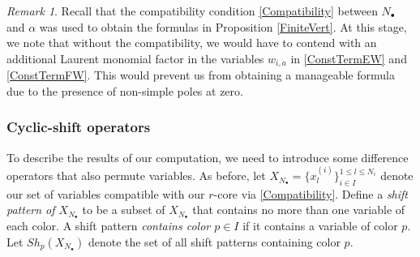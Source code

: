 \documentclass{amsart}
\newcommand{\comment}[1]{}
\theoremstyle{remark}
\newtheorem{rem}[thm]{Remark}
\numberwithin{thm}{section}
\numberwithin{equation}{section}
\begin{document}
\begin{rem}\label{CompRem}
Recall that the compatibility condition \eqref{Compatibility} between $N_\bullet$ and $\alpha$ was used to obtain the formulas in Proposition \ref{FiniteVert}.
At this stage, we note that without the compatibility, we would have to contend with an additional Laurent monomial factor in the variables $w_{i,a}$ in \eqref{ConstTermEW} and \eqref{ConstTermFW}. 
This would prevent us from obtaining a manageable formula due to the presence of non-simple poles at zero.
\end{rem}

\comment{
\begin{proof}
First notice that we can factor any variable $w_{i,a}$ out of $g_n^\pm(w_{\bullet,\bullet},X_{N_\bullet})$ without creating a new pole at $w_{i,a}=0$.
The proposed formulas follow from general considerations involving partial fraction decomposition.
Namely, let $F(x)$ be a rational function with simple finite poles $p_1,\ldots,p_m$ that do not lie on the unit circle $|x|=1$.
By partial fraction decomposition, we have
\[
xF(x)=\sum_{i=1}^m\frac{x\mathrm{Res}_{p_i}(F)}{x-p_i}
\]
where $\mathrm{Res}_{p_i}(F)$ is the residue of $F$ at $p_i$.
Now consider the effect of expanding into Laurent series expansion assuming $|x|=1$ and taking constant terms.
If $p_i$ is outside of the unit circle, then its summand becomes
\[
\frac{x\mathrm{Res}_{p_i}(F)}{x-p_i}=-\frac{x p_i^{-1}\mathrm{Res}_{p_i}(F)}{\displaystyle 1-x/p_i}
\]
which will have trivial constant term.
On the other hand, if $p_i$ is inside the unit circle, then its summand is
\[
\frac{x\mathrm{Res}_{p_i}(F)}{x-p_i}=\frac{\mathrm{Res}_{p_i}(F)}{\displaystyle 1-p_i/x}
\]
which will have constant term $\mathrm{Res}_{p_i}(F)$.
Thus, overall,
\[
\{xF(x)\}_0=\sum_{\substack{i=1\\|p_i|<1}}^m\mathrm{Res}_{p_i}(F)\qedhere
\]
\end{proof}
}

\subsubsection{Cyclic-shift operators}\label{Cyclic}
To describe the results of our computation, we need to introduce some difference operators that also permute variables.
As before, let $X_{N_\bullet}=\{x_{l}^{(i)}\}_{i\in I}^{1\le l\le N_i}$ denote our set of variables compatible with our $r$-core via \eqref{Compatibility}.
Define a \textit{shift pattern of $X_{N_\bullet}$} to be a subset of $X_{N_\bullet}$ that contains no more than one variable of each color.
A shift pattern \textit{contains color $p\in I$} if it contains a variable of color $p$.
Let $Sh_p(X_{N_\bullet})$ denote the set of all shift patterns containing color $p$. 
\end{document}
